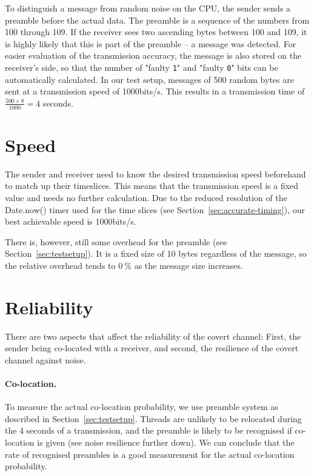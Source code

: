 \documentclass[11pt,
  titlepage=false,
  parskip=half,      %
]{scrreprt}
\begin{document}
To distinguish a message from random noise on the CPU, the sender sends a preamble before the actual data.
The preamble is a sequence of the numbers from 100 through 109.
If the receiver sees two ascending bytes between 100 and 109, it is highly likely that this is part of the preamble --
a message was detected.
For easier evaluation of the transmission accuracy, the message is also stored on the receiver's side,
so that the number of "faulty \texttt{1}" and "faulty \texttt{0}" bits can be automatically calculated.
In our test setup, messages of 500 random bytes are sent at a transmission speed of 1000bits/s.
This results in a transmission time of $\frac{500 \times 8}{1000} = 4$ seconds.

\section{Speed}
The sender and receiver need to know the desired transmission speed beforehand to match up their timeslices.
This means that the transmission speed is a fixed value and needs no further calculation.
Due to the reduced resolution of the Date.now() timer used for the time slices (see Section~\ref{sec:accurate-timing}),
our best achievable speed is 1000bits/s.

There is, however, still some overhead for the preamble (see Section~\ref{sec:testsetup}).
It is a fixed size of 10 bytes regardless of the message,
so the relative overhead tends to $0~\%$ as the message size increases.

\section{Reliability}
There are two aspects that affect the reliability of the covert channel:
First, the sender being co-located with a receiver, and second, the resilience of the covert channel against noise.

\paragraph{Co-location.}
To measure the actual co-location probability, we use preamble system as described in Section~\ref{sec:testsetup}.
Threads are unlikely to be relocated during the 4 seconds of a transmission,
and the preamble is likely to be recognised if co-location is given (see noise resilience further down).
We can conclude that the rate of recognised preambles is a good measurement for the actual co-location probability.
\end{document}

